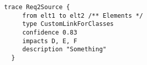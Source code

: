 
\begin{center}
\begin{lstlisting}[caption={Sample of a concrete syntax for tracing annotations},
label=lst:strategy1,
style=mystylesysml,
linewidth=12.5cm,
xleftmargin=4.2cm,
morekeywords={type,confidence,description}]
  trace Req2Source {
     from elt1 to elt2 /** Elements */ 
     type CustomLinkForClasses
     confidence 0.83
     impacts D, E, F
     description "Something"
  }
\end{lstlisting}
\end{center}  
